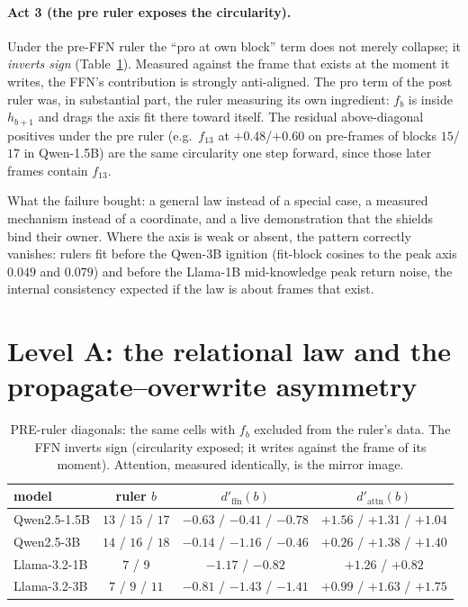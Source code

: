 \documentclass[11pt]{article}
\begin{document}
\paragraph{Act 3 (the pre ruler exposes the circularity).} Under the
pre-FFN ruler the ``pro at own block'' term does not merely collapse; it
\emph{inverts sign} (Table~\ref{tab:pre}). Measured against the frame that
exists at the moment it writes, the FFN's contribution is strongly
anti-aligned. The pro term of the post ruler was, in substantial part, the
ruler measuring its own ingredient: $f_b$ is inside $h_{b+1}$ and drags the
axis fit there toward itself. The residual above-diagonal positives under
the pre ruler (e.g.\ $f_{13}$ at $+0.48$/$+0.60$ on pre-frames of blocks
$15$/$17$ in Qwen-1.5B) are the same circularity one step forward, since
those later frames contain $f_{13}$.

What the failure bought: a general law instead of a special case, a measured
mechanism instead of a coordinate, and a live demonstration that the shields
bind their owner. Where the axis is weak or absent, the pattern correctly
vanishes: rulers fit before the Qwen-3B ignition (fit-block cosines to the
peak axis $0.049$ and $0.079$) and before the Llama-1B mid-knowledge peak
return noise, the internal consistency expected if the law is about frames
that exist.

\section{Level A: the relational law and the propagate--overwrite asymmetry}
\label{sec:law}

\begin{table}[H]
\centering
\caption{PRE-ruler diagonals: the same cells with $f_b$ excluded from the
ruler's data. The FFN inverts sign (circularity exposed; it writes against
the frame of its moment). Attention, measured identically, is the mirror
image.}
\label{tab:pre}
\begin{tabular}{lccc}
\toprule
model & ruler $b$ & $d'_{\mathrm{ffn}}(b)$ & $d'_{\mathrm{attn}}(b)$ \\
\midrule
Qwen2.5-1.5B & $13$ / $15$ / $17$ & $-0.63$ / $-0.41$ / $-0.78$ & $+1.56$ / $+1.31$ / $+1.04$ \\
Qwen2.5-3B   & $14$ / $16$ / $18$ & $-0.14$ / $-1.16$ / $-0.46$ & $+0.26$ / $+1.38$ / $+1.40$ \\
Llama-3.2-1B & $7$ / $9$          & $-1.17$ / $-0.82$           & $+1.26$ / $+0.82$ \\
Llama-3.2-3B & $7$ / $9$ / $11$   & $-0.81$ / $-1.43$ / $-1.41$ & $+0.99$ / $+1.63$ / $+1.75$ \\
\bottomrule
\end{tabular}
\end{table}
\end{document}
